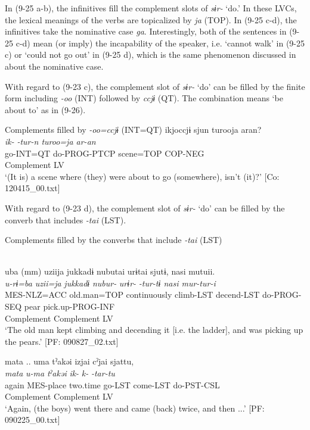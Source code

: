 In (9-25 a-b), the infinitives fill the complement slots of \textit{sɨr-} ‘do.’ In these LVCs, the lexical meanings of the verbs are topicalized by \textit{ja} (TOP). In (9-25 c-d), the infinitives take the nominative case \textit{ga}. Interestingly, both of the sentences in (9-25 c-d) mean (or imply) the incapability of the speaker, i.e. ‘cannot walk’ in (9-25 c) or ‘could not go out’ in (9-25 d), which is the same phenomenon discussed in  about the nominative case.

With regard to (9-23 c), the complement slot of \textit{sɨr-} ‘do’ can be filled by the finite form including \textit{{}-oo} (INT) followed by \textit{ccjɨ} (QT). The combination means ‘be about to’ as in (9-26).

\ea   Complements filled by \textit{{}-oo=ccjɨ} (INT=QT) \label{ex:9.26}
 \gllll  ikjoccjɨ  sjun  turooja  aran?\\
    \textit{ik-}  \textit{-tur-n  turoo=ja  ar-an}\\
    go-INT=QT  do-PROG-PTCP  scene=TOP  COP-NEG\\
    Complement  LV    \\
    \glt     ‘(It is) a scene where (they) were about to go (somewhere), isn’t (it)?’ [Co: 120415\_00.txt]
\z

  With regard to (9-23 d), the complement slot of \textit{sɨr-} ‘do’ can be filled by the converb that includes \textit{{}-tai} (LST).

\ea   Complements filled by the converbs that include \textit{{}-tai} (LST) \label{ex:9.27}

  \ea \label{ex:9.27a}\relax [= (8-93 b)]\\
    \gllll  uba  (mm)  uziija  jukkadɨ  nubutai  urɨtai  sjutɨ,  nasi  mutuii.\\
      \textit{u-rɨ=ba}    \textit{uzii=ja}  \textit{jukkadɨ}  \textit{nubur-} \textit{urɨr-}  \textit{-tur-tɨ  nasi  mur-tur-i}\\
      MES-NLZ=ACC    old.man=TOP  continuously  climb-LST  decend-LST  do-PROG-SEQ  pear  pick.up-PROG-INF\\
              Complement                                   Complement  LV    \\
      \glt       ‘The old man kept climbing and decending it [i.e. the ladder], and was picking up the pears.’ [PF: 090827\_02.txt]

\ex \label{ex:9.27b} %
    \gllll  mata  ..  uma  tˀakəi  izjai  cˀjai  sjattu,\\
      \textit{mata}    \textit{u-ma}  \textit{tˀakəi}  \textit{ik-}  \textit{k-}  \textit{-tar-tu}\\
      again    MES-place  two.time  go-LST  come-LST  do-PST-CSL\\
              Complement  Complement  LV\\
      \glt       ‘Again, (the boys) went there and came (back) twice, and then ...’ [PF: 090225\_00.txt]
    \z
\z

